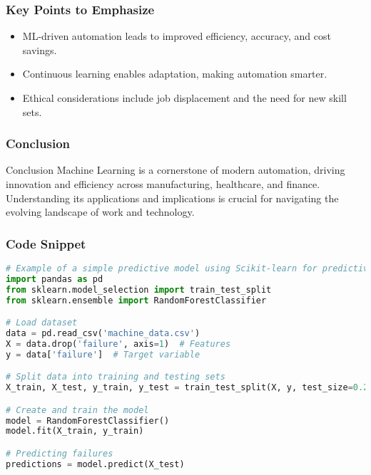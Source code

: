 \documentclass{beamer}
\begin{document}
\begin{frame}[fragile]
    \frametitle{Key Points to Emphasize}
    \begin{itemize}
        \item ML-driven automation leads to improved efficiency, accuracy, and cost savings.
        \item Continuous learning enables adaptation, making automation smarter.
        \item Ethical considerations include job displacement and the need for new skill sets.
    \end{itemize}
\end{frame}

\begin{frame}[fragile]
    \frametitle{Conclusion}
    \begin{block}{Conclusion}
        Machine Learning is a cornerstone of modern automation, driving innovation and efficiency across manufacturing, healthcare, and finance. Understanding its applications and implications is crucial for navigating the evolving landscape of work and technology.
    \end{block}
\end{frame}

\begin{frame}[fragile]
    \frametitle{Code Snippet}
    \begin{lstlisting}[language=Python]
# Example of a simple predictive model using Scikit-learn for predictive maintenance
import pandas as pd
from sklearn.model_selection import train_test_split
from sklearn.ensemble import RandomForestClassifier

# Load dataset
data = pd.read_csv('machine_data.csv')
X = data.drop('failure', axis=1)  # Features
y = data['failure']  # Target variable

# Split data into training and testing sets
X_train, X_test, y_train, y_test = train_test_split(X, y, test_size=0.2, random_state=42)

# Create and train the model
model = RandomForestClassifier()
model.fit(X_train, y_train)

# Predicting failures
predictions = model.predict(X_test)
    \end{lstlisting}
\end{frame}
\end{document}
